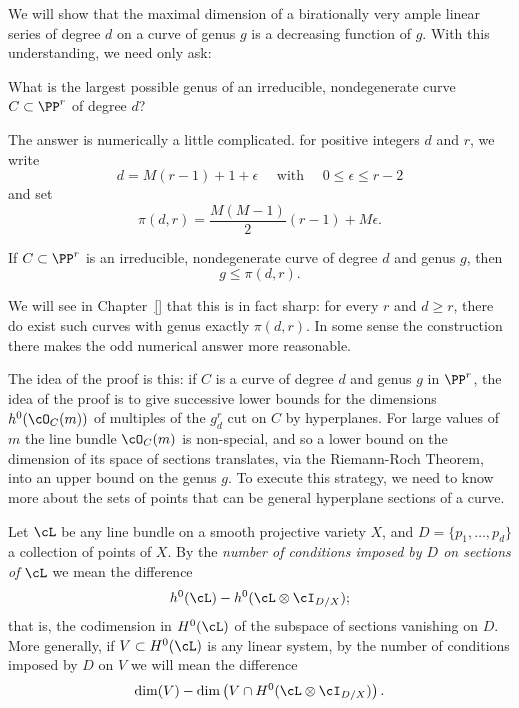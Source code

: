 We will show that the maximal dimension of a birationally very ample linear series of degree $d$ on a curve of genus $g$ is a decreasing function of $g$. With this understanding, we need only ask:

\begin{question}
What is the largest possible genus of an irreducible, nondegenerate curve $C \subset \PP^r$ of degree $d$?
\end{question}

The answer is numerically a little complicated. for positive integers $d$ and $r$, we write
$$
 d = M(r-1) + 1 + \epsilon \quad \text{ with } \quad 0 \leq \epsilon \leq r-2
$$
and set
$$
\pi(d,r) = \frac{M(M-1)}{2}(r-1) + M\epsilon.
$$

\begin{theorem}
If $C \subset \PP^r$ is an irreducible, nondegenerate curve of degree $d$ and genus $g$, then
$$
g \leq \pi(d,r).
$$
\end{theorem}


We will see in Chapter~\ref{} that this is in fact sharp: for every $r$ and $d \geq r$, there do exist such curves with genus exactly $\pi(d,r)$. In
some sense the construction there makes the odd numerical answer more reasonable. 

The idea of the proof is this: if $C$ is a curve of degree $d$ and genus $g$ in $\PP^r$, the idea of the proof is to give successive lower bounds for the dimensions $h^0(\cO_C(m))$ of multiples of the $g^r_d$ cut on $C$ by hyperplanes. For large values of $m$ the line bundle $\cO_C(m)$ is non-special, and so a lower bound on the dimension of its space of sections translates, via the Riemann-Roch Theorem, into an upper bound on the genus $g$. To execute this strategy, we need to know more about the sets of points that can be general hyperplane sections of a curve.

\begin{definition}
Let $\cL$ be any line bundle on a smooth projective variety $X$, and $D = \{p_1,\dots,p_d\}$ a collection of points of $X$. By the \emph{number of conditions imposed by $D$ on sections of $\cL$} we  mean  the difference
$$
h^0(\cL) - h^0(\cL \otimes \cI_{D/X});
$$
that is, the codimension in $H^0(\cL)$ of the subspace of sections vanishing on $D$. More generally, if $V \subset H^0(\cL)$ is any linear system, by the number of conditions imposed by $D$ on $V$ we will mean the difference
$$
\dim(V) - \dim \left(V \cap H^0(\cL\otimes \cI_{D/X}) \right).
$$
\end{definition}


